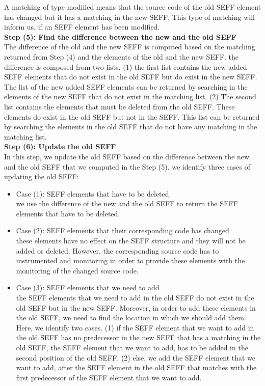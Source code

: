 A matching of type modified means that the source code of the old SEFF element has changed but it has a matching in the new SEFF. This type of matching will inform us, if an SEFF element has been modified.\\

\textbf{Step (5): Find the difference between the new and the old SEFF}\\
The difference  of the old and the new SEFF is computed based on the matching returned from
Step (4) and the elements of the old and the new SEFF. the difference is composed from two lists. (1) the first list contains the new added SEFF elements that do not exist in the old SEFF but do exist in the new SEFF. The list of the new added SEFF elements can be returned by searching in the elements of the new SEFF that do not exist in the matching list.  (2) The second list contains the elements that must be deleted from the old SEFF. These elements do exist in the old SEFF but not in the SEFF. This list can be returned by searching the elements in the old SEFF that do not have any matching in the matching list.\\

\textbf{Step (6): Update the old SEFF}\\
In this step, we update the old SEFF based on the difference between the new and the old SEFF that we computed in the Step (5). we identify three cases of updating the old SEFF:
\begin{itemize}
\item Case (1): SEFF elements that have to be deleted\\
      we use the difference of the new and the old SEFF to return the SEFF elements that have to be deleted.
 \item Case (2): SEFF elements that their corresponding code has changed\\
       these elements have no effect on the SEFF structure and they will not be added or deleted. However, the corresponding source code has to instrumented and monitoring in order to provide these elements with the monitoring of the changed source code. 
\item Case (3): SEFF elements that we need to add\\
the SEFF elements that we need to add in the old SEFF do not exist in the old SEFF but in the new SEFF. Moreover, in order to add these elements in the old SEFF, we need to find the location in which we should add them. Here, we identify two cases. (1) if the SEFF element that we want to add in the old SEFF has no predecessor in the new SEFF that has a matching in the old SEFF, the SEFF element that we want to add, has to be added in the second position of the old SEFF. (2) else, we add the SEFF element that we want to add, after the SEFF element in the old SEFF that matches with the first predecessor of the SEFF element that we want to add.  \\
\end{itemize}

